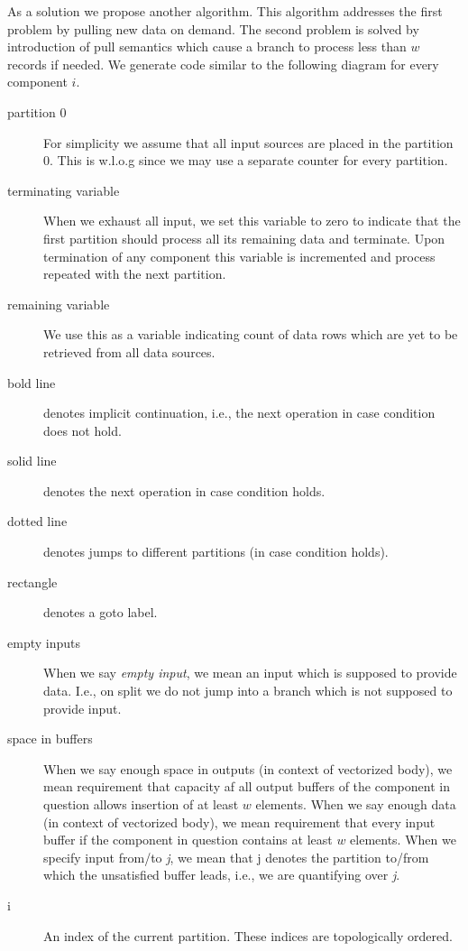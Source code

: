 As a solution we propose another algorithm. This algorithm addresses the first problem by pulling new data on demand. The second problem is solved by introduction of pull semantics which cause a branch to process less than $w$ records if needed. We generate code similar to the following diagram for every component $i$.

\label{ordered_crawler}

\begin{description}
 \item[partition 0] For simplicity we assume that all input sources are placed in the partition 0. This is w.l.o.g since we may use a separate counter for every partition. 
  \item[terminating variable] When we exhaust all input, we set this variable to zero to indicate that the first partition should process all its remaining data and terminate. Upon termination of any component this variable is incremented and process repeated with the next partition.
  \item[remaining variable] We use this as a variable indicating count of data rows which are yet to be retrieved from all data sources. 
  \item[bold line] denotes implicit continuation, i.e., the next operation in case condition does not hold. 
  \item[solid line] denotes the next operation in case condition holds.
  \item[dotted line] denotes jumps to different partitions (in case condition holds).
  \item[rectangle] denotes a goto label.
 \item[empty inputs] When we say \emph{empty input}, we mean an input which is supposed to provide data. I.e., on split we do not jump into a branch which is not supposed to provide input.
  \item[space in buffers] When we say enough space in outputs (in context of vectorized body), we mean requirement that capacity af all output buffers of the component in question allows insertion of at least $w$ elements. When we say enough data (in context of vectorized body), we mean requirement that every input buffer if the component in question contains at least $w$ elements. When we specify input from/to \emph{j}, we mean that j denotes the partition to/from which the unsatisfied buffer leads, i.e., we are quantifying over \emph{j}.
  \item[i] An index of the current partition. These indices are topologically ordered.

\end{description}
